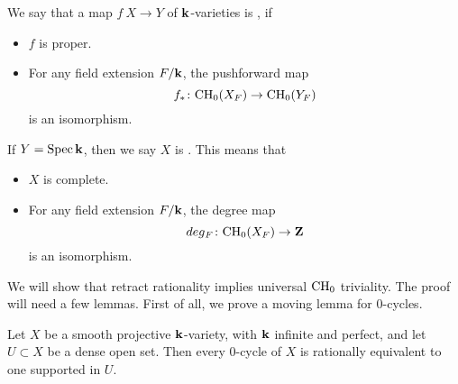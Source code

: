 \begin{definition}
    We say that a map $f \: X \to Y$ of $\bbk$-varieties is
    , if
    \begin{itemize}
        \item
            $f$ is proper.
        \item
            For any field extension $F / \bbk$, the pushforward map
            \[ f_* \colon \mathrm{CH}_0 (X_F) \to \mathrm{CH}_0 (Y_F) \]
            is an isomorphism.
    \end{itemize}
    If $Y = \Spec \bbk$, then we say $X$ is
    . This means that
    \begin{itemize}
        \item
            $X$ is complete.
        \item
            For any field extension $F / \bbk$, the degree map
            \[ \deg_F \: \CH_0 (X_F) \to \bbZ \]
            is an isomorphism.
    \end{itemize}
\end{definition}

We will show that retract rationality implies universal $\mathrm{CH}_0$ triviality.
The proof will need a few lemmas.
First of all, we prove a moving lemma for $0$-cycles.

\begin{lemma} \label{lem-2-moving}
    Let $X$ be a smooth projective $\bbk$-variety, with $\bbk$ infinite and perfect,
    and let $U \subset X$ be a dense open set.
    Then every $0$-cycle of $X$ is rationally equivalent to one supported in $U$.
\end{lemma}

